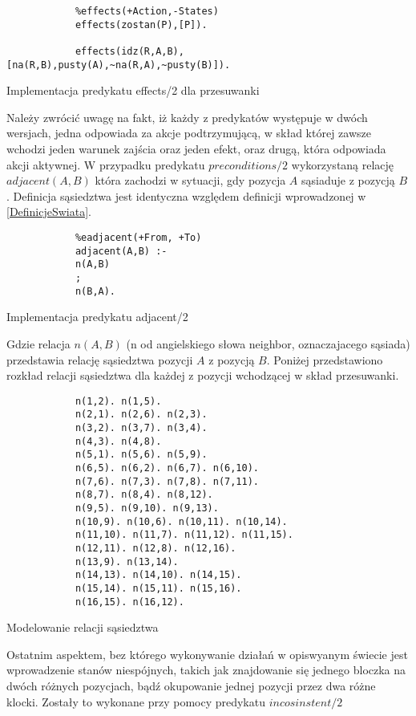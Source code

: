    \begin{listing}[H]
        \begin{verbatim}
            %effects(+Action,-States)
            effects(zostan(P),[P]).

            effects(idz(R,A,B), [na(R,B),pusty(A),~na(R,A),~pusty(B)]).
        \end{verbatim}
    \caption{Implementacja predykatu effects/2 dla przesuwanki}
    \end{listing}

    Należy zwrócić uwagę na fakt, iż każdy z predykatów występuje w dwóch wersjach, jedna odpowiada za akcje podtrzymującą, w skład której 
    zawsze wchodzi jeden warunek zajścia oraz jeden efekt, oraz drugą, która odpowiada akcji aktywnej. W przypadku predykatu $preconditions/2$
    wykorzystaną relację $adjacent(A,B)$ która zachodzi w sytuacji, gdy pozycja $A$ sąsiaduje z pozycją $B$. Definicja sąsiedztwa jest identyczna 
    względem definicji wprowadzonej w \ref{DefinicjeSwiata}.

    \begin{listing}[H]
        \begin{verbatim}
            %eadjacent(+From, +To)
            adjacent(A,B) :-
            n(A,B)
            ;
            n(B,A).
        \end{verbatim}
    \caption{Implementacja predykatu adjacent/2}
    \end{listing}
    
    Gdzie relacja $n(A,B)$ (n od angielskiego słowa neighbor, oznaczajacego sąsiada)
    przedstawia relację sąsiedztwa pozycji $A$ z pozycją $B$. Poniżej przedstawiono rozkład relacji 
    sąsiedztwa dla każdej z pozycji wchodzącej w skład przesuwanki.

    \begin{listing}[H]
        \begin{verbatim}
            n(1,2). n(1,5).
            n(2,1). n(2,6). n(2,3).
            n(3,2). n(3,7). n(3,4).
            n(4,3). n(4,8).
            n(5,1). n(5,6). n(5,9).
            n(6,5). n(6,2). n(6,7). n(6,10).
            n(7,6). n(7,3). n(7,8). n(7,11).
            n(8,7). n(8,4). n(8,12).
            n(9,5). n(9,10). n(9,13).
            n(10,9). n(10,6). n(10,11). n(10,14).
            n(11,10). n(11,7). n(11,12). n(11,15).
            n(12,11). n(12,8). n(12,16). 
            n(13,9). n(13,14).
            n(14,13). n(14,10). n(14,15).
            n(15,14). n(15,11). n(15,16).
            n(16,15). n(16,12).
        \end{verbatim}
    \caption{Modelowanie relacji sąsiedztwa}
    \end{listing}
    Ostatnim aspektem, bez którego wykonywanie działań w opiswyanym świecie jest wprowadzenie stanów niespójnych, takich jak znajdowanie 
    się jednego bloczka na dwóch różnych pozycjach, bądź okupowanie jednej pozycji przez dwa różne klocki. Zostały to wykonane 
    przy pomocy predykatu $incosinstent/2$

